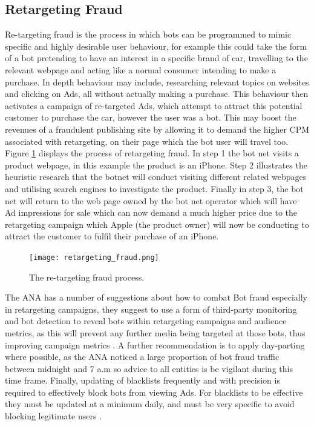 \documentclass[12pt]{article}
\begin{document}
\subsection{Retargeting Fraud}
Re-targeting fraud is the process in which bots can be programmed to mimic specific and highly desirable user behaviour, for example this could take the form of a bot pretending to have an interest in a specific brand of car, travelling to the relevant webpage and acting like a normal consumer intending to make a purchase. In depth behaviour may include, researching relevant topics on websites and clicking on Ads, all without actually making a purchase. This behaviour then activates a campaign of re-targeted Ads, which attempt to attract this potential customer to purchase the car, however the user was a bot. This may boost the revenues of a fraudulent publishing site by allowing it to demand the higher CPM associated with retargeting, on their page which the bot user will travel too. Figure \ref{fig:retargeting_fraud} displays the process of retargeting fraud. In step 1 the bot net visits a product webpage, in this example the product is an iPhone. Step 2 illustrates the heuristic research that the botnet will conduct visiting different related webpages and utilising search engines to investigate the product. Finally in step 3, the bot net will return to the web page owned by the bot net operator which will have Ad impressions for sale which can now demand a much higher price due to the retargeting campaign which Apple (the product owner) will now be conducting to attract the customer to fulfil their purchase of an iPhone.  \\

\begin{figure} [H]
    \centering
    \texttt{[image: retargeting\_fraud.png]}
    \caption{The re-targeting fraud process.}
    \label{fig:retargeting_fraud}
\end{figure}

The ANA has a number of suggestions about how to combat Bot fraud especially in retargeting campaigns, they suggest to use a form of third-party monitoring and bot detection to reveal bots within retargeting campaigns and audience metrics, as this will prevent any further media being targeted at those bots, thus improving campaign metrics \parencite{botfraud2015}. A further recommendation is to apply day-parting where possible, as the ANA noticed a large proportion of bot fraud traffic between midnight and 7 a.m so advice to all entities is be vigilant during this time frame. Finally, updating of blacklists frequently and with precision is required to effectively block bots from viewing Ads. For blacklists to be effective they must be updated at a minimum daily, and must be very specific to avoid blocking legitimate users \parencite{botfraud2015}.  
\end{document}
